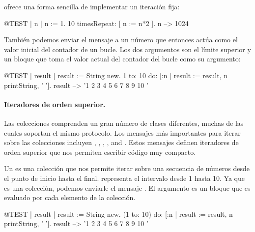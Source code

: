 \documentclass[a4paper,10pt,twoside]{book}
\begin{document}
\noindent
{} ofrece una forma sencilla de implementar un iteraci\'on fija:

\begin{code}{@TEST | n |}
n := 1.
10 timesRepeat: [ n := n*2 ].
n --> 1024
\end{code}

Tambi\'en podemos enviar el mensaje  a un n\'umero que entonces act\'ua como el valor inicial del contador de un bucle.
Los dos argumentos son el l\'imite superior y un bloque que toma el valor actual del contador del bucle como su argumento: 

\begin{code}{@TEST | result |}
result := String new.
1 to: 10 do: [:n | result := result, n printString, ' '].
result --> '1 2 3 4 5 6 7 8 9 10 '
\end{code}


\paragraph{Iteradores de orden superior.}
Las colecciones comprenden un gran n\'umero de clases diferentes, muchas de las cuales soportan el mismo protocolo.
Los mensajes m\'as importantes para iterar sobre las colecciones incluyen 
, , , ,  and .
Estos mensajes definen iteradores de orden superior que nos permiten escribir c\'odigo muy compacto.

Un  es una colecci\'on que nos permite iterar sobre una secuencia de n\'umeros desde el punto de inicio hasta el final.  representa el intervalo desde 1 hasta 10.
Ya que es una colecci\'on, podemos enviarle el mensaje .
El argumento es un bloque que es evaluado por cada elemento de la colecci\'on.

\begin{code}{@TEST | result |}
result := String new.
(1 to: 10) do: [:n | result := result, n printString, ' '].
result --> '1 2 3 4 5 6 7 8 9 10 '
\end{code}
\end{document}
